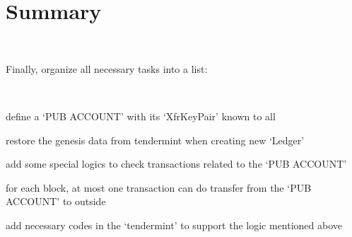 \section{Summary}

~\par

Finally, organize all necessary tasks into a list:

~\par

\begin{ENUMERATE}
    \item define a `PUB ACCOUNT' with its `XfrKeyPair' known to all
    \item restore the genesis data from tendermint when creating new `Ledger'
    \item add some special logics to check transactions related to the `PUB ACCOUNT'
    \item for each block, at most one transaction can do transfer from the `PUB ACCOUNT' to outside
    \item add necessary codes in the `tendermint' to support the logic mentioned above
\end{ENUMERATE}